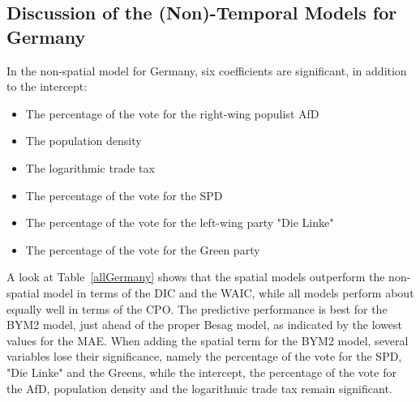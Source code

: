 \subsection{Discussion of the (Non)-Temporal Models for Germany}
In the non-spatial model for Germany, six coefficients are significant, in addition to the intercept:
\begin{itemize}
    \item The percentage of the vote for the right-wing populist AfD
    \item The population density
    \item The logarithmic trade tax
    \item The percentage of the vote for the SPD
    \item The percentage of the vote for the left-wing party "Die Linke"
    \item The percentage of the vote for the Green party
\end{itemize}
A look at Table~\ref{allGermany} shows that the spatial models outperform the non-spatial model in terms of the DIC and the WAIC, while all models perform about equally well in terms of the CPO. The predictive performance is best for the BYM2 model, just ahead of the proper Besag model, as indicated by the lowest values for the MAE. When adding the spatial term for the BYM2 model, several variables lose their significance, namely the percentage of the vote for the SPD, "Die Linke" and the Greens, while the intercept, the percentage of the vote for the AfD, population density and the logarithmic trade tax remain significant. \\
